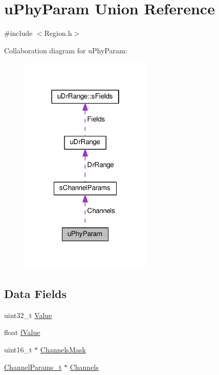 \hypertarget{unionuPhyParam}{}\section{u\+Phy\+Param Union Reference}
\label{unionuPhyParam}


{\ttfamily \#include $<$Region.\+h$>$}



Collaboration diagram for u\+Phy\+Param\+:
\nopagebreak
\begin{figure}[H]
\begin{center}
\leavevmode
\includegraphics[width=178pt]{unionuPhyParam__coll__graph}
\end{center}
\end{figure}
\subsection*{Data Fields}
\begin{DoxyCompactItemize}
\item 
uint32\+\_\+t \hyperlink{unionuPhyParam_aed3ac490dcac46f2b6c06566f6fdbc56}{Value}
\item 
float \hyperlink{unionuPhyParam_a45e40c02153e3c6fc4b6578b217e9c5b}{f\+Value}
\item 
uint16\+\_\+t $\ast$ \hyperlink{unionuPhyParam_a76583d386fefae802f5d11c040d04ba2}{Channels\+Mask}
\item 
\hyperlink{group__LORAMAC_ga1360ca6f82c6d125ea43a9dad9b56184}{Channel\+Params\+\_\+t} $\ast$ \hyperlink{unionuPhyParam_a3025546f58e55d9601321e2f613ab264}{Channels}
\end{DoxyCompactItemize}



